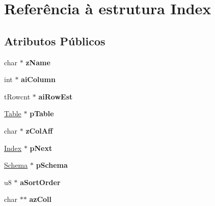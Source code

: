 \hypertarget{struct_index}{\section{Referência à estrutura Index}
\label{struct_index}
}
\subsection*{Atributos Públicos}
\begin{DoxyCompactItemize}
\item 
\hypertarget{struct_index_a8848cddf6e09f22e3b794ec019082ced}{char $\ast$ {\bfseries z\-Name}}\label{struct_index_a8848cddf6e09f22e3b794ec019082ced}

\item 
\hypertarget{struct_index_acbb125339b02ca6819dd2e382de2d639}{int $\ast$ {\bfseries ai\-Column}}\label{struct_index_acbb125339b02ca6819dd2e382de2d639}

\item 
\hypertarget{struct_index_aa408555f4da96ca1fae741ff6d33a3bf}{t\-Rowcnt $\ast$ {\bfseries ai\-Row\-Est}}\label{struct_index_aa408555f4da96ca1fae741ff6d33a3bf}

\item 
\hypertarget{struct_index_a01c6d4da27cba325ca58f333f87a6f44}{\hyperlink{struct_table}{Table} $\ast$ {\bfseries p\-Table}}\label{struct_index_a01c6d4da27cba325ca58f333f87a6f44}

\item 
\hypertarget{struct_index_af076df9f74dd836001c0a59d27274c0e}{char $\ast$ {\bfseries z\-Col\-Aff}}\label{struct_index_af076df9f74dd836001c0a59d27274c0e}

\item 
\hypertarget{struct_index_a115a17d236bd277d59dd5ea030954c3e}{\hyperlink{struct_index}{Index} $\ast$ {\bfseries p\-Next}}\label{struct_index_a115a17d236bd277d59dd5ea030954c3e}

\item 
\hypertarget{struct_index_af14f5ddd57eab2aba63dcb5db2aa92af}{\hyperlink{struct_schema}{Schema} $\ast$ {\bfseries p\-Schema}}\label{struct_index_af14f5ddd57eab2aba63dcb5db2aa92af}

\item 
\hypertarget{struct_index_a0a3fc87b53193995f59c9657443e9a99}{u8 $\ast$ {\bfseries a\-Sort\-Order}}\label{struct_index_a0a3fc87b53193995f59c9657443e9a99}

\item 
\hypertarget{struct_index_ab690ebb96c0329896b0fe2ab56813b88}{char $\ast$$\ast$ {\bfseries az\-Coll}}\label{struct_index_ab690ebb96c0329896b0fe2ab56813b88}


\end{DoxyCompactItemize}
